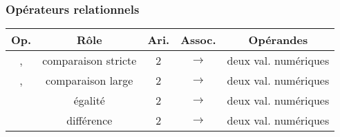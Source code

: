 \begin{frame}[fragile]
\frametitle{Opérateurs relationnels}

\begin{center}
    \begin{tabular}{c|c|c|c|c}
        {\bf Op.} & {\bf Rôle} & {\bf Ari.} & {\bf Assoc.}
            & {\bf Opérandes} \\ \hline \hline
        \Code{<}, \Code{>} & comparaison stricte & 2 & $\longrightarrow$
            & deux val. numériques \\ \hline
        \Code{<=}, \Code{>=} & comparaison large & 2 & $\longrightarrow$
            & deux val. numériques \\ \hline
        \Code{==} & égalité & 2 & $\longrightarrow$ & deux val. numériques \\ \hline
        \Code{!=} & différence & 2 & $\longrightarrow$ & deux val. numériques
    \end{tabular}
\end{center}
\medskip

\end{frame}


